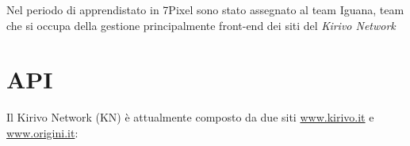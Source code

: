 


Nel periodo di apprendistato\cite{ETICHETTA} in 7Pixel sono stato assegnato al team Iguana, team che si occupa
della gestione principalmente front-end dei siti del \emph{Kirivo Network}

\section{API}
Il Kirivo Network (KN) è attualmente composto da due siti  \url{www.kirivo.it} 
e \url{www.origini.it}:
